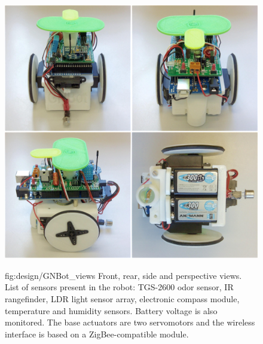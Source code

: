 \begin{figure}[h!]
\centerline{\mbox{\includegraphics[width=13.5cm]{images/design/GNBot_views.eps}}}
{fig:design/GNBot_views}{
Front, rear, side and perspective views. List of sensors present in the robot:
TGS-2600 odor sensor, IR rangefinder, LDR light sensor array, electronic compass module, temperature and humidity sensors.
Battery voltage is also monitored.
The base actuators are two servomotors and the wireless interface is based on a ZigBee-compatible module.
}\end{figure}




\newpage \thispagestyle{empty} %

